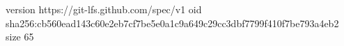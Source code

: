 version https://git-lfs.github.com/spec/v1
oid sha256:cb560ead143c60e2eb7cf7be5e0a1c9a649c29cc3dbf7799f410f7be793a4eb2
size 65
